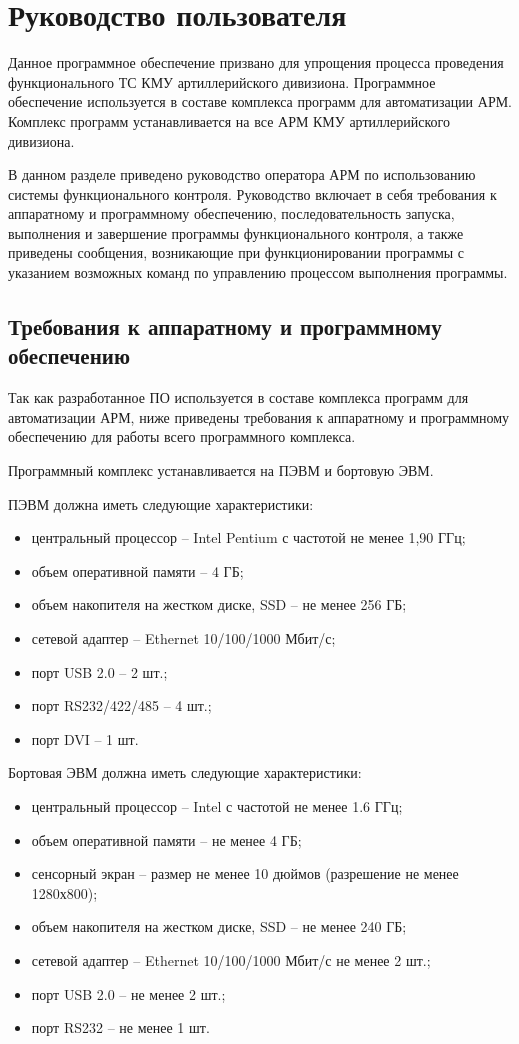 \section{Руководство пользователя}
\label{sec:guide}

Данное программное обеспечение призвано для упрощения процесса проведения функционального ТС КМУ артиллерийского
дивизиона.\break
Программное обеспечение используется в составе комплекса программ для автоматизации АРМ.
Комплекс программ устанавливается на все АРМ КМУ артиллерийского дивизиона.

В данном разделе приведено руководство оператора АРМ по использованию системы функционального контроля.
Руководство включает в себя требования к аппаратному и программному обеспечению, последовательность запуска, выполнения
и завершение программы функционального контроля, а также приведены сообщения, возникающие при функционировании программы
с указанием возможных команд по управлению процессом выполнения программы.

\subsection{Требования к аппаратному и программному обеспечению}
\label{sub:guide:reqs}

Так как разработанное ПО используется в составе комплекса программ для автоматизации АРМ, ниже приведены требования к
аппаратному и программному обеспечению для работы всего программного комплекса.

Программный комплекс устанавливается на ПЭВМ и бортовую ЭВМ.

ПЭВМ должна иметь следующие характеристики:
\begin{itemize}
	\item центральный процессор -- Intel Pentium с частотой не менее 1,90 ГГц;
	\item объем оперативной памяти -- 4 ГБ;
	\item объем накопителя на жестком диске, SSD -- не менее 256 ГБ;
	\item сетевой адаптер -- Ethernet 10/100/1000 Мбит/с;
	\item порт USB 2.0 -- 2 шт.;
	\item порт RS232/422/485 -- 4 шт.;
	\item порт DVI -- 1 шт.
\end{itemize}

Бортовая ЭВМ должна иметь следующие характеристики:
\begin{itemize}
	\item центральный процессор -- Intel с частотой не менее 1.6 ГГц;
	\item объем оперативной памяти -- не менее 4 ГБ;
	\item сенсорный экран -- размер не менее 10 дюймов (разрешение не менее 1280х800);
	\item объем накопителя на жестком диске, SSD -- не менее 240 ГБ;
	\item сетевой адаптер -- Ethernet 10/100/1000 Мбит/с не менее 2 шт.;
	\item порт USB 2.0 -- не менее 2 шт.;
	\item порт RS232 -- не менее 1 шт.
\end{itemize}

